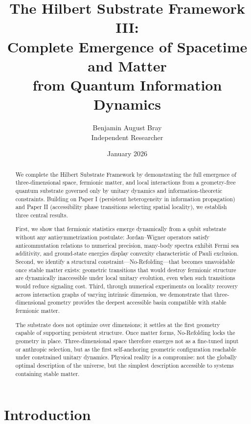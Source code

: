 \documentclass[11pt]{article}
\title{\textbf{The Hilbert Substrate Framework III:}\\
Complete Emergence of Spacetime and Matter\\
from Quantum Information Dynamics}
\author{Benjamin August Bray\\
\small Independent Researcher}
\date{January 2026}
\begin{document}
\maketitle

\begin{abstract}
We complete the Hilbert Substrate Framework by demonstrating the full emergence of three-dimensional space, fermionic matter, and local interactions from a geometry-free quantum substrate governed only by unitary dynamics and information-theoretic constraints. Building on Paper I (persistent heterogeneity in information propagation) and Paper II (accessibility phase transitions selecting spatial locality), we establish three central results.

First, we show that fermionic statistics emerge dynamically from a qubit substrate without any antisymmetrization postulate: Jordan--Wigner operators satisfy anticommutation relations to numerical precision, many-body spectra exhibit Fermi sea additivity, and ground-state energies display convexity characteristic of Pauli exclusion. Second, we identify a structural constraint---No-Refolding---that becomes unavoidable once stable matter exists: geometric transitions that would destroy fermionic structure are dynamically inaccessible under local unitary evolution, even when such transitions would reduce signaling cost. Third, through numerical experiments on locality recovery across interaction graphs of varying intrinsic dimension, we demonstrate that three-dimensional geometry provides the deepest accessible basin compatible with stable fermionic matter.

The substrate does not optimize over dimensions; it settles at the first geometry capable of supporting persistent structure. Once matter forms, No-Refolding locks the geometry in place. Three-dimensional space therefore emerges not as a fine-tuned input or anthropic selection, but as the first self-anchoring geometric configuration reachable under constrained unitary dynamics. Physical reality is a compromise: not the globally optimal description of the universe, but the simplest description accessible to systems containing stable matter.
\end{abstract}

\tableofcontents

\newpage

\section{Introduction}
\end{document}
